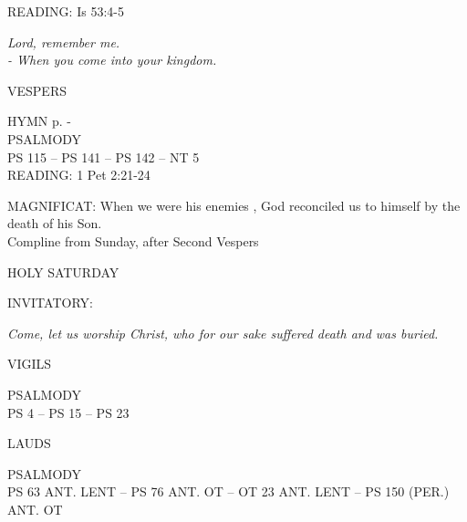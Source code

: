 \noindent\small{\uppercase{READING:}}    Is 53:4-5 \textbf{   \\}
\begin{center}
\textit{Lord, remember me.\\
- When you come into your kingdom.}\end{center}

\begin{flushleft}\normalsize{\uppercase{VESPERS\\}}\end{flushleft}
\small{\uppercase{HYMN} p. \pageref{lent:firstHymn}-\pageref{lent:lastHymn}\\}
\noindent\small{\uppercase{PSALMODY}\\}
\uppercase{Ps 115 -- Ps 141 -- Ps 142 -- NT 5}\vspace{0.5em}\\

\noindent\small{\uppercase{READING:}}    1 Pet 2:21-24 \textbf{   \\}

\noindent\small{\uppercase{MAGNIFICAT:}}	When we were his enemies , God reconciled us to himself by the death of his Son.\\

Compline from Sunday, after Second Vespers

	\begin{center}
\normalsize HOLY SATURDAY
	\end{center}

\small{\uppercase{INVITATORY:}}\normalsize
\begin{center}
\textit{Come, let us worship Christ, who for our sake suffered death and was buried.\\}
\end{center}
\begin{flushleft}\normalsize{\uppercase{VIGILS\\}}\end{flushleft}
\noindent\small{\uppercase{PSALMODY}\\}
\uppercase{Ps 4 -- Ps 15 -- Ps 23}\vspace{0.5em}\\

\begin{flushleft}\normalsize{\uppercase{LAUDS\\}}\end{flushleft}
\noindent\small{\uppercase{PSALMODY}\\}
\uppercase{Ps 63 ant. Lent -- Ps 76 ant. OT -- OT 23 ant. Lent -- Ps 150 (Per.) ant. OT}\vspace{0.5em}\\

